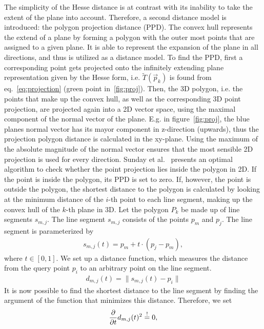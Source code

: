 The simplicity of the Hesse distance is at contrast with its inability to take the extent of the plane into account.
Therefore, a second distance model is introduced: the polygon projection distance (PPD).
The convex hull represents the extend of a plane by forming a polygon with the outer most points that are assigned to a given plane. 
It is able to represent the expansion of the plane in all directions, and thus is utilized as a distance model.
To find the PPD, first a corresponding point gets projected onto the infinitely extending plane representation given by the Hesse form, i.e. $\widetilde{T}(\vec{p}_k)$ is found from eq.~\eqref{eq:projection} (green point in~\ref{fig:proj}).
Then, the 3D polygon, i.e. the points that make up the convex hull, as well as the corresponding 3D point projection, are projected again into a 2D vector space, using the maximal component of the normal vector of the plane.
E.g. in figure~\ref{fig:proj}, the blue planes normal vector has its mayor component in z-direction (upwards), thus the projection polygon distance is calculated in the xy-plane.
Using the maximum of the absolute magnitude of the normal vector ensures that the most sensible 2D projection is used for every direction.
Sunday et al.~\cite{pga} presents an optimal algorithm to check whether the point projection lies inside the polygon in 2D. 
If the point is inside the polygon, its PPD is set to zero.
If, however, the point is outside the polygon, the shortest distance to the polygon is calculated by looking at the minimum distance of the $i$-th point to each line segment, making up the convex hull of the $k$-th plane in 3D.
Let the polygon $P_k$ be made up of line segments $s_{m, j}$.
The line segment $s_{m, j}$ consists of the points $p_m$ and $p_j$.
The line segment is parameterized by
\begin{align}
\label{eq:line}
	s_{m, j}(t) = p_m + t \cdot \left( p_j - p_m \right) ,  
\end{align}
where $t \in \left[ 0, 1 \right]$. 
We set up a distance function, which measures the distance from the query point $p_i$ to an arbitrary point on the line segment.
\begin{align}
	\label{eq:dist}
	d_{m, j}(t) = \lVert s_{m, j}(t) - p_i \rVert 
\end{align} 
It is now possible to find the shortest distance to the line segment by finding the argument of the function that minimizes this distance.
Therefore, we set
\begin{align}
	\frac{\partial}{\partial t} d_{m, j}(t)^2 \overset{!}{=} 0 ,
\end{align}  
